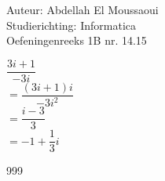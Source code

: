 \documentclass[a4paper]{article}
\begin{document}
  
\noindent \large Auteur: Abdellah El Moussaoui \\
\noindent \large Studierichting: Informatica\\
\noindent \large Oefeningenreeks 1B nr. 14.15\\

\medskip

\normalsize

$\dfrac{3i+1}{-3i}$\\

$= \dfrac{(3i+1)i}{-3i^2}$\\

$= \dfrac{i -3}{3}$\\

$= -1 + \dfrac{1}{3}i$\\

\begin{thebibliography}{999}
\end{thebibliography}
\end{document}
